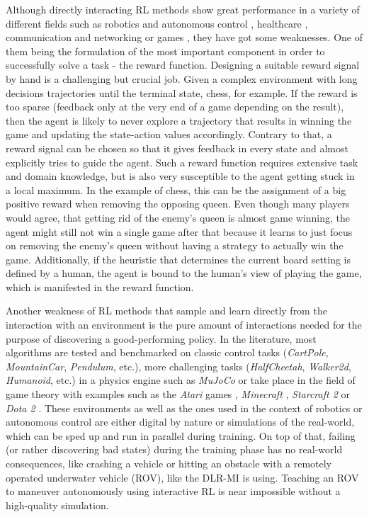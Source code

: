 Although directly interacting RL methods show great performance in a variety of different fields such as robotics and autonomous control \cite[]{etemad2020using, patil2021deep, wang2018reinforcement}, healthcare \cite[]{tseng2017deep, yu2019incorporating},  communication and networking \cite[]{chinchali2018cellular, fadlullah2017state}  or games \cite[]{berner2019dota, mnih2013playing, wu2016training}, they have got some weaknesses. One of them being the formulation of the most important component in order to successfully solve a task - the reward function. Designing a suitable reward signal by hand is a challenging but crucial job. Given a complex environment with long decisions trajectories until the terminal state, chess, for example. If the reward is too sparse (feedback only at the very end of a game depending on the result), then the agent is likely to never explore a trajectory that results in winning the game and updating the state-action values accordingly. Contrary to that, a reward signal can be chosen so that it gives feedback in every state and almost explicitly tries to guide the agent. Such a reward function requires extensive task and domain knowledge, but is also very susceptible to the agent getting stuck in a local maximum. In the example of chess, this can be the assignment of a big positive reward when removing the opposing queen. Even though many players would agree, that getting rid of the enemy's queen is almost game winning, the agent might still not win a single game after that because it learns to just focus on removing the enemy's queen without having a strategy to actually win the game. Additionally, if the heuristic that determines the current board setting is defined by a human, the agent is bound to the human's view of playing the game, which is manifested in the reward function. 
\par
Another weakness of RL methods that sample and learn directly from the interaction with an environment is the pure amount of interactions needed for the purpose of discovering a good-performing policy. In the literature, most algorithms are tested and benchmarked on classic control tasks (\textit{CartPole}, \textit{MountainCar}, \textit{Pendulum}, etc.), more challenging tasks (\textit{HalfCheetah}, \textit{Walker2d}, \textit{Humanoid}, etc.) in a physics engine such as \textit{MuJoCo} \cite[]{todorov2012mujoco} or take place in the field of game theory with examples such as the \textit{Atari} games \cite[]{mnih2013playing}, \textit{Minecraft} \cite[]{johnson2016malmo}, \textit{Starcraft 2} \cite[]{vinyals2019grandmaster} or \textit{Dota 2} \cite[]{berner2019dota}. These environments as well as the ones used in the context of robotics or autonomous control are either digital by nature or simulations of the real-world, which can be sped up and run in parallel during training. On top of that, failing (or rather discovering bad states) during the training phase has no real-world consequences, like crashing a vehicle or hitting an obstacle with a remotely operated underwater vehicle (ROV), like the DLR-MI is using. Teaching an ROV to maneuver autonomously using interactive RL is near impossible without a high-quality simulation.
